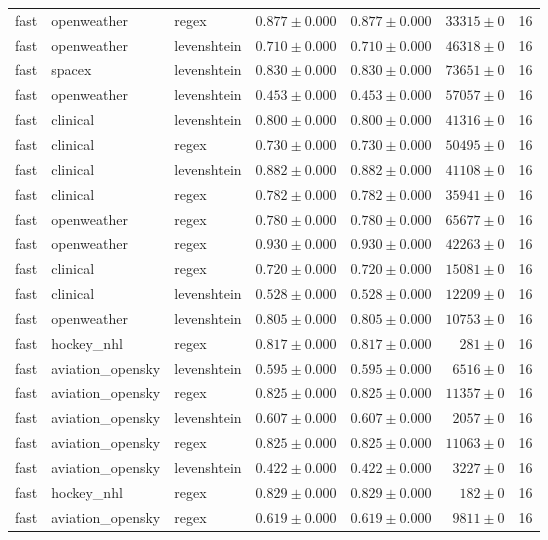 \begin{table}[htbp]
\begin{tabular}{l l l r r r r}
fast & openweather & regex & $0.877\pm0.000$ & $0.877\pm0.000$ & $33315\pm0$ & 16 \\
fast & openweather & levenshtein & $0.710\pm0.000$ & $0.710\pm0.000$ & $46318\pm0$ & 16 \\
fast & spacex & levenshtein & $0.830\pm0.000$ & $0.830\pm0.000$ & $73651\pm0$ & 16 \\
fast & openweather & levenshtein & $0.453\pm0.000$ & $0.453\pm0.000$ & $57057\pm0$ & 16 \\
fast & clinical & levenshtein & $0.800\pm0.000$ & $0.800\pm0.000$ & $41316\pm0$ & 16 \\
fast & clinical & regex & $0.730\pm0.000$ & $0.730\pm0.000$ & $50495\pm0$ & 16 \\
fast & clinical & levenshtein & $0.882\pm0.000$ & $0.882\pm0.000$ & $41108\pm0$ & 16 \\
fast & clinical & regex & $0.782\pm0.000$ & $0.782\pm0.000$ & $35941\pm0$ & 16 \\
fast & openweather & regex & $0.780\pm0.000$ & $0.780\pm0.000$ & $65677\pm0$ & 16 \\
fast & openweather & regex & $0.930\pm0.000$ & $0.930\pm0.000$ & $42263\pm0$ & 16 \\
fast & clinical & regex & $0.720\pm0.000$ & $0.720\pm0.000$ & $15081\pm0$ & 16 \\
fast & clinical & levenshtein & $0.528\pm0.000$ & $0.528\pm0.000$ & $12209\pm0$ & 16 \\
fast & openweather & levenshtein & $0.805\pm0.000$ & $0.805\pm0.000$ & $10753\pm0$ & 16 \\
fast & hockey\_nhl & regex & $0.817\pm0.000$ & $0.817\pm0.000$ & $281\pm0$ & 16 \\
fast & aviation\_opensky & levenshtein & $0.595\pm0.000$ & $0.595\pm0.000$ & $6516\pm0$ & 16 \\
fast & aviation\_opensky & regex & $0.825\pm0.000$ & $0.825\pm0.000$ & $11357\pm0$ & 16 \\
fast & aviation\_opensky & levenshtein & $0.607\pm0.000$ & $0.607\pm0.000$ & $2057\pm0$ & 16 \\
fast & aviation\_opensky & regex & $0.825\pm0.000$ & $0.825\pm0.000$ & $11063\pm0$ & 16 \\
fast & aviation\_opensky & levenshtein & $0.422\pm0.000$ & $0.422\pm0.000$ & $3227\pm0$ & 16 \\
fast & hockey\_nhl & regex & $0.829\pm0.000$ & $0.829\pm0.000$ & $182\pm0$ & 16 \\
fast & aviation\_opensky & regex & $0.619\pm0.000$ & $0.619\pm0.000$ & $9811\pm0$ & 16 \\

\end{tabular}
\end{table}
